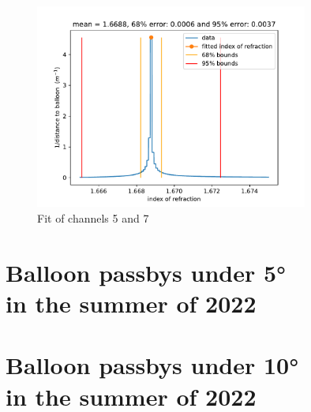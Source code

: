 \documentclass[11pt,a4paper,faculty=we,language=en,doctype=report]{cls/ugent-doc}
\begin{document}
\begin{figure}
	\centering
	\includegraphics[width=0.8\textwidth]{Ch5And7Fit.pdf}
	\caption{Fit of channels 5 and 7}
	\label{fig:Ch5And7}
\end{figure}

\chapter{Balloon passbys under 5°\\ in the summer of 2022}
\label{app:5Deg}
\chapter{Balloon passbys under 10°\\ in the summer of 2022}
\label{app:10Deg}
\begin{table}[h!]
\end{table}
\begin{table}
\end{table}
\begin{table}
\end{table}
\begin{table}
\end{table}
\begin{table}
\end{table}

\newpage


\end{document}

